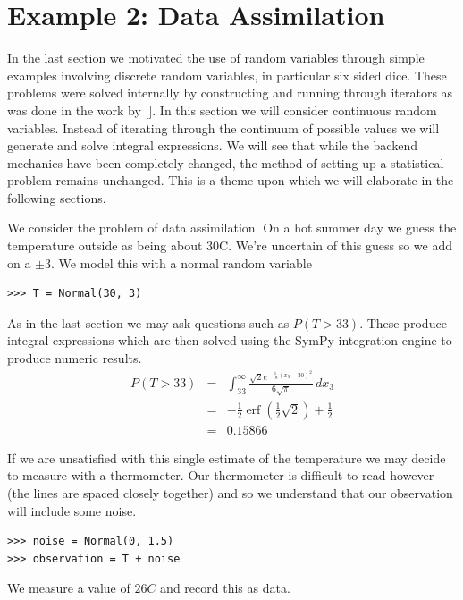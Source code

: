 \section{Example 2: Data Assimilation}

In the last section we motivated the use of random variables through simple examples involving discrete random variables, in particular six sided dice. These problems were solved internally by constructing and running through iterators as was done in the work by []. In this section we will consider continuous random variables. Instead of iterating through the continuum of possible values we will generate and solve integral expressions. We will see that while the
backend mechanics have been completely changed, the method of setting up a statistical problem remains unchanged. This is a theme upon which we will elaborate in the following sections. 

We consider the problem of data assimilation. On a hot summer day we guess the temperature outside as being about 30C. We're uncertain of this guess so we add on a $\pm3$. We model this with a normal random variable

\begin{lstlisting}
>>> T = Normal(30, 3)
\end{lstlisting}

As in the last section we may ask questions such as $P(T>33)$. These produce integral expressions which are then solved using the SymPy integration engine to produce numeric results.
\begin{eqnarray*}
P(T>33) & = & \int_{33}^{\infty} \frac{\sqrt{2} e^{- \frac{1}{18} \left(x_{3} -30\right)^{2}}}{6 \sqrt{\pi}}\, dx_{3} \\
& = & - \frac{1}{2} \operatorname{erf}{\left (\frac{1}{2} \sqrt{2} \right )} + \frac{1}{2} \\
& = & 0.15866
\end{eqnarray*}

If we are unsatisfied with this single estimate of the temperature we may decide to measure with a thermometer. Our thermometer is difficult to read however (the lines are spaced closely together) and so we understand that our observation will include some noise. 

\begin{lstlisting}
>>> noise = Normal(0, 1.5)
>>> observation = T + noise
\end{lstlisting}

We measure a value of $26C$ and record this as data.

